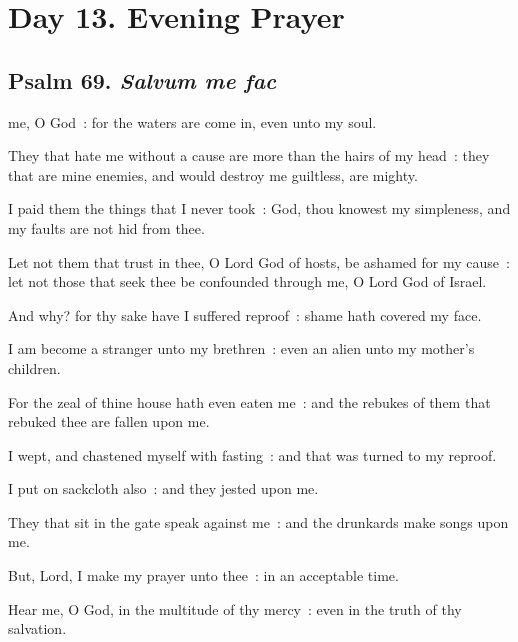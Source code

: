 \section*{Day 13. Evening Prayer}

\subsection{Psalm 69. \textit{Salvum me fac}}


 me, O God~: for the waters are come in, even unto my soul.\par
{}
They that hate me without a cause are more than the hairs of my head~: they that are mine enemies, and would destroy me guiltless, are mighty.\par
{}I paid them the things that I never took~: God, thou knowest my simpleness, and my faults are not hid from thee.\par
{}Let not them that trust in thee, O Lord God of hosts, be ashamed for my cause~: let not those that seek thee be confounded through me, O Lord God of Israel.\par
{}And why? for thy sake have I suffered reproof~: shame hath covered my face.\par
{}I am become a stranger unto my brethren~: even an alien unto my mother's children.\par
{}For the zeal of thine house hath even eaten me~: and the rebukes of them that rebuked thee are fallen upon me.\par
{}I wept, and chastened myself with fasting~: and that was turned to my reproof.\par
{}I put on sackcloth also~: and they jested upon me.\par
{}They that sit in the gate speak against me~: and the drunkards make songs upon me.\par
{}But, Lord, I make my prayer unto thee~: in an acceptable time.\par
{}Hear me, O God, in the multitude of thy mercy~: even in the truth of thy salvation.\par

